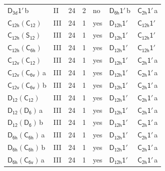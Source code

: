 \documentclass[10pt,a4paper]{article}
\numberwithin{equation}{section}
\newcommand{\grp}[1]{\mathsf{#1}}
\newcommand{\clsletter}[1]{\,{\scriptsize\color{black!55}#1}}
\begin{document}
{\begin{longtable}{@{}llrrlll@{}}
\href{D3d-1p.pdf}{$\grp{D_{3d}1'}$}\clsletter{b} & II & 24 & 2 & no & \href{D6h-1p.pdf}{$\grp{D_{6h}1'}$}\clsletter{b} & \href{C2h-1p.pdf}{$\grp{C_{2h}1'}$}\clsletter{a}\\
\href{C12h-C12.pdf}{$\grp{C_{12h}}(\grp{C_{12}})$} & III & 24 & 1 & yes & \href{D12h-1p.pdf}{$\grp{D_{12h}1'}$} & \href{C12h-1p.pdf}{$\grp{C_{12h}1'}$}\\
\href{C12h-S12.pdf}{$\grp{C_{12h}}(\grp{S_{12}})$} & III & 24 & 1 & yes & \href{D12h-1p.pdf}{$\grp{D_{12h}1'}$} & \href{C12h-1p.pdf}{$\grp{C_{12h}1'}$}\\
\href{C12h-C6h.pdf}{$\grp{C_{12h}}(\grp{C_{6h}})$} & III & 24 & 1 & yes & \href{D12h-1p.pdf}{$\grp{D_{12h}1'}$} & \href{C12h-1p.pdf}{$\grp{C_{12h}1'}$}\\
\href{C12v-C12.pdf}{$\grp{C_{12v}}(\grp{C_{12}})$} & III & 24 & 1 & yes & \href{D12h-1p.pdf}{$\grp{D_{12h}1'}$} & \href{C2h-1p.pdf}{$\grp{C_{2h}1'}$}\clsletter{a}\\
\href{C12v-C6v.pdf}{$\grp{C_{12v}}(\grp{C_{6v}})$}\clsletter{a} & III & 24 & 1 & yes & \href{D12h-1p.pdf}{$\grp{D_{12h}1'}$} & \href{C2h-1p.pdf}{$\grp{C_{2h}1'}$}\clsletter{a}\\
\href{C12v-C6v.pdf}{$\grp{C_{12v}}(\grp{C_{6v}})$}\clsletter{b} & III & 24 & 1 & yes & \href{D12h-1p.pdf}{$\grp{D_{12h}1'}$} & \href{C2h-1p.pdf}{$\grp{C_{2h}1'}$}\clsletter{a}\\
\href{D12-C12.pdf}{$\grp{D_{12}}(\grp{C_{12}})$} & III & 24 & 1 & yes & \href{D12h-1p.pdf}{$\grp{D_{12h}1'}$} & \href{C2h-1p.pdf}{$\grp{C_{2h}1'}$}\clsletter{a}\\
\href{D12-D6.pdf}{$\grp{D_{12}}(\grp{D_{6}})$}\clsletter{a} & III & 24 & 1 & yes & \href{D12h-1p.pdf}{$\grp{D_{12h}1'}$} & \href{C2h-1p.pdf}{$\grp{C_{2h}1'}$}\clsletter{a}\\
\href{D12-D6.pdf}{$\grp{D_{12}}(\grp{D_{6}})$}\clsletter{b} & III & 24 & 1 & yes & \href{D12h-1p.pdf}{$\grp{D_{12h}1'}$} & \href{C2h-1p.pdf}{$\grp{C_{2h}1'}$}\clsletter{a}\\
\href{D6h-C6h.pdf}{$\grp{D_{6h}}(\grp{C_{6h}})$}\clsletter{a} & III & 24 & 1 & yes & \href{D12h-1p.pdf}{$\grp{D_{12h}1'}$} & \href{C2h-1p.pdf}{$\grp{C_{2h}1'}$}\clsletter{a}\\
\href{D6h-C6h.pdf}{$\grp{D_{6h}}(\grp{C_{6h}})$}\clsletter{b} & III & 24 & 1 & yes & \href{D12h-1p.pdf}{$\grp{D_{12h}1'}$} & \href{C2h-1p.pdf}{$\grp{C_{2h}1'}$}\clsletter{a}\\
\href{D6h-C6v.pdf}{$\grp{D_{6h}}(\grp{C_{6v}})$}\clsletter{a} & III & 24 & 1 & yes & \href{D12h-1p.pdf}{$\grp{D_{12h}1'}$} & \href{C2h-1p.pdf}{$\grp{C_{2h}1'}$}\clsletter{a}\\

\end{longtable}}
\end{document}
